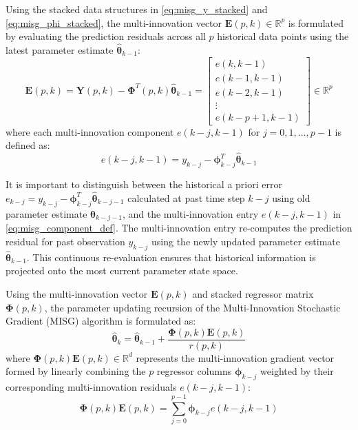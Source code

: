Using the stacked data structures in \eqref{eq:misg_y_stacked} and \eqref{eq:misg_phi_stacked}, the multi-innovation vector $\mathbf{E}(p, k) \in \mathbb{R}^p$ is formulated by evaluating the prediction residuals across all $p$ historical data points using the latest parameter estimate $\hat{\boldsymbol{\theta}}_{k-1}$:
\begin{equation}
\mathbf{E}(p, k) = \mathbf{Y}(p, k) - \boldsymbol{\Phi}^T(p, k) \hat{\boldsymbol{\theta}}_{k-1} = \begin{bmatrix} e(k, k-1) \\ e(k-1, k-1) \\ e(k-2, k-1) \\ \vdots \\ e(k-p+1, k-1) \end{bmatrix} \in \mathbb{R}^p
\label{eq:misg_vector_def}
\end{equation}
where each multi-innovation component $e(k-j, k-1)$ for $j = 0, 1, \dots, p-1$ is defined as:
\begin{equation}
e(k-j, k-1) = y_{k-j} - \boldsymbol{\phi}_{k-j}^T \hat{\boldsymbol{\theta}}_{k-1}
\label{eq:misg_component_def}
\end{equation}

It is important to distinguish between the historical a priori error $e_{k-j} = y_{k-j} - \boldsymbol{\phi}_{k-j}^T \hat{\boldsymbol{\theta}}_{k-j-1}$ calculated at past time step $k-j$ using old parameter estimate $\hat{\boldsymbol{\theta}}_{k-j-1}$, and the multi-innovation entry $e(k-j, k-1)$ in \eqref{eq:misg_component_def}. The multi-innovation entry re-computes the prediction residual for past observation $y_{k-j}$ using the newly updated parameter estimate $\hat{\boldsymbol{\theta}}_{k-1}$. This continuous re-evaluation ensures that historical information is projected onto the most current parameter state space.

Using the multi-innovation vector $\mathbf{E}(p, k)$ and stacked regressor matrix $\boldsymbol{\Phi}(p, k)$, the parameter updating recursion of the Multi-Innovation Stochastic Gradient (MISG) algorithm is formulated as:
\begin{equation}
\hat{\boldsymbol{\theta}}_k = \hat{\boldsymbol{\theta}}_{k-1} + \frac{\boldsymbol{\Phi}(p, k) \mathbf{E}(p, k)}{r(p, k)}
\label{eq:misg_update_law_main}
\end{equation}
where $\boldsymbol{\Phi}(p, k) \mathbf{E}(p, k) \in \mathbb{R}^d$ represents the multi-innovation gradient vector formed by linearly combining the $p$ regressor columns $\boldsymbol{\phi}_{k-j}$ weighted by their corresponding multi-innovation residuals $e(k-j, k-1)$:
\begin{equation}
\boldsymbol{\Phi}(p, k) \mathbf{E}(p, k) = \sum_{j=0}^{p-1} \boldsymbol{\phi}_{k-j} e(k-j, k-1)
\label{eq:misg_gradient_expansion}
\end{equation}


